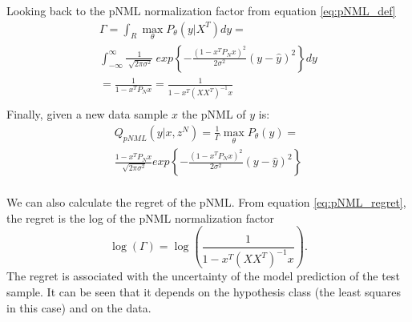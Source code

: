 \documentclass[conference,letterpaper]{IEEEtran}
\begin{document}
Looking back to the pNML normalization factor from equation \ref{eq:pNML_def}
\begin{multline}
\Gamma = \int_R \max_{\theta} P_\theta(y|X^T)dy = \\
\int_{-\infty}^{\infty} \frac{1}{\sqrt[]{2\pi\sigma^2}}
\ exp\left\{-\frac{(1 - x^T P_N x )^2 }{2\sigma^2}
\left(y- \hat{y} \right)^2\right\} dy\\ 
=\frac{1}{1 - x^T P_N x } 
=\frac{1}{1 - x^T (XX^T)^{-1} x } \\
\end{multline}
Finally, given a new data sample $x$ the pNML of $y$ is:
\begin{multline}
Q_{pNML}(y | x, z^N) = \frac{1}{\Gamma}\max_{\theta}P_{\theta}(y) = \\
\frac{1 - x^T P_N x }{\sqrt[]{2\pi\sigma^2}}
exp\left\{-\frac{(1 - x^T P_N x )^2 }{2\sigma^2}\left(y-\hat{y} \right)^2\right\} \\
\end{multline}

We can also calculate the regret of the pNML. From equation \ref{eq:pNML_regret}, the regret is the log of the pNML normalization factor
\begin{equation} \label{eq:regret}
\log(\Gamma) = \log\left(\frac{1}{1 - x^T (XX^T)^{-1} x } \right).
\end{equation}
The regret is associated with the uncertainty of the model prediction of the test sample. It can be seen that it depends on the hypothesis class (the least squares in this case) and on the data.
\end{document}
